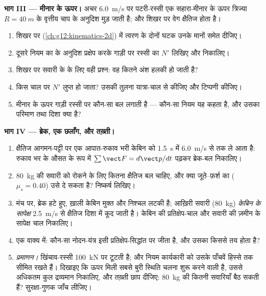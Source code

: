 \begin{problem}
\medskip
\noindent\textbf{भाग III --- मीनार के ऊपर।} अचर \qty{6.0}{m/s} पर पटरी-रस्सी एक
सहारा-मीनार के ऊपर त्रिज्या $R = \qty{40}{m}$ के  वृत्तीय चाप के अनुदिश मुड़
जाती है; और शिखर पर वेग क्षैतिज होता है।
\begin{enumerate}[resume]
  \item शिखर पर  (\cref{ch:g12:kinematics-2d}) में त्वरण के दोनों घटक उनके
        मानों समेत दीजिए।
  \item दूसरे नियम का  के अनुदिश प्रक्षेप करके गाड़ी पर रस्सी का
         $N'$ लिखिए और निकालिए।
  \item शिखर पर सवारी के  के लिए वही प्रश्न: वह कितने अंश
        हलकी हो जाती है?
  \item किस चाल पर $N'$ लुप्त हो जाता? उसकी तुलना यात्रा-चाल से कीजिए और
        टिप्पणी कीजिए।
  \item मीनार के ऊपर गाड़ी रस्सी पर कौन-सा बल लगाती है --- कौन-सा
        नियम यह कहता है, और उसका परिमाण तथा दिशा क्या है?
\end{enumerate}

\medskip
\noindent\textbf{भाग IV --- ब्रेक, एक छलाँग, और तख़्ती।}
\begin{enumerate}[resume]
  \item क्षैतिज आगमन-पट्टी पर एक आपात-रुकाव भरी केबिन को \qty{1.5}{s} में \qty{6.0}{m/s}
        से  तक ले आता है: रुकाव भर के औसत के रूप में $\sum \vect F = d\vect p/dt$ पढ़कर
        ब्रेक-बल निकालिए।
  \item \qty{80}{kg} की सवारी को रोकने के लिए कितना क्षैतिज बल चाहिए, और
        क्या जूते--फ़र्श का  ($\mu_s = 0.40$) उसे दे सकता है?
        निष्कर्ष लिखिए।
  \item मंच पर, ब्रेक हटे हुए, ख़ाली केबिन मुक्त और निश्चल लटकी है; आख़िरी
        सवारी (\qty{80}{kg}) \emph{केबिन के सापेक्ष} \qty{2.5}{m/s} से क्षैतिज दिशा में
        कूद जाती है। केबिन की प्रतिक्षेप-चाल और सवारी की ज़मीन के सापेक्ष चाल
        निकालिए।
  \item एक वाक्य में: कौन-सा नोदन-यंत्र इसी प्रतिक्षेप-सिद्धांत पर जीता है,
        और उसका  किससे तय होता है?
  \item \emph{प्रमाणन।} खिंचाव-रस्सी \qty{100}{kN} पर टूटती है; और नियम कार्यकारी
         को उसके पाँचवें हिस्से तक सीमित रखते हैं। दिखाइए कि ऊपर
        मिली सबसे बुरी स्थिति चलना शुरू करने वाली है, उससे अधिकतम कुल
        द्रव्यमान निकालिए, और तख़्ती छाप दीजिए: \qty{80}{kg} की कितनी सवारियाँ बैठ
        सकती हैं? सुरक्षा-गुणक जाँच लीजिए।
\end{enumerate}
\end{problem}

